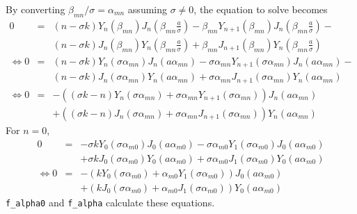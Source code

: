 \documentclass{article}
\newcommand{\inlinecode}[1]{{\colorbox[rgb]{0.9,0.9,0.9}{\lstinline|#1|}}}
\begin{document}
By converting $\beta_{mn} / \sigma = \alpha_{mn}$ assuming $\sigma \ne 0$, the equation to solve becomes
\begin{eqnarray}
    0 &=& (n - \sigma k)Y_n(\beta_{mn})J_n\left(\beta_{mn}\frac{a}{\sigma}\right) -
          \beta_{mn}Y_{n+1}(\beta_{mn})J_n\left(\beta_{mn}\frac{a}{\sigma}\right) -\nonumber\\
      & & (n - \sigma k)J_n(\beta_{mn})Y_n\left(\beta_{mn}\frac{a}{\sigma}\right) +
          \beta_{mn}J_{n+1}(\beta_{mn})Y_n\left(\beta_{mn}\frac{a}{\sigma}\right) \nonumber\\
\Leftrightarrow
    0 &=& (n - \sigma k)Y_n(\sigma\alpha_{mn})J_n\left(a\alpha_{mn}\right) -
          \sigma\alpha_{mn}Y_{n+1}(\sigma\alpha_{mn})J_n\left(a\alpha_{mn}\right) -\nonumber\\
      & & (n - \sigma k)J_n(\sigma\alpha_{mn})Y_n\left(a\alpha_{mn}\right) +
          \sigma\alpha_{mn}J_{n+1}(\sigma\alpha_{mn})Y_n\left(a\alpha_{mn}\right) \nonumber\\
\Leftrightarrow
    0 &=& -((\sigma k - n)Y_n(\sigma\alpha_{mn}) + \sigma\alpha_{mn}Y_{n+1}(\sigma\alpha_{mn}))
          J_n\left(a\alpha_{mn}\right) \nonumber\\
      & & +((\sigma k - n)J_n(\sigma\alpha_{mn}) + \sigma\alpha_{mn}J_{n+1}(\sigma\alpha_{mn}))
          Y_n\left(a\alpha_{mn}\right) \nonumber
\end{eqnarray}
%
For $n = 0$,
%
\begin{eqnarray}
    0 &=& -\sigma kY_0(\sigma\alpha_{m0})J_0\left(a\alpha_{m0}\right) -
          \sigma\alpha_{m0}Y_{1}(\sigma\alpha_{m0})J_0\left(a\alpha_{m0}\right) \nonumber\\
      & & +\sigma kJ_0(\sigma\alpha_{m0})Y_0\left(a\alpha_{m0}\right) +
          \sigma\alpha_{m0}J_{1}(\sigma\alpha_{m0})Y_0\left(a\alpha_{m0}\right) \nonumber\\
\Leftrightarrow
    0 &=& -(kY_0(\sigma\alpha_{m0}) + \alpha_{m0}Y_{1}(\sigma\alpha_{m0}))J_0\left(a\alpha_{m0}\right)\nonumber\\
      & & +(kJ_0(\sigma\alpha_{m0}) + \alpha_{m0}J_{1}(\sigma\alpha_{m0}))Y_0\left(a\alpha_{m0}\right)\nonumber
\end{eqnarray}
%
\inlinecode{f_alpha0} and \inlinecode{f_alpha} calculate these equations.
\end{document}
